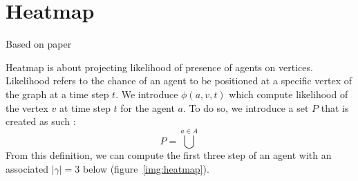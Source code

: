 















\section{Heatmap}

Based on paper \cite{atstfestko20a}

Heatmap is about projecting likelihood of presence of agents on vertices. Likelihood refers to the chance of an agent to be positioned at a specific vertex of the graph at a time step \(t\). We introduce \(\phi(a,v,t)\) which compute likelihood of the vertex \(v\) at time step \(t\) for the agent \(a\). 
To do so, we introduce a set \(P\) that is created as such : \[
  P = \bigcup^{a\in A}{}
\]
 From this definition, we can compute the first three step of an agent with an associated \(|\gamma|=3\) below (figure~\ref{img:heatmap}).

